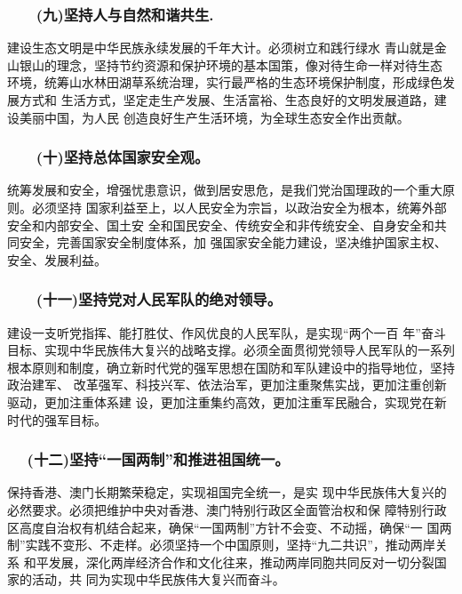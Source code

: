 \documentclass[11pt]{ctexart}
\begin{document}
{{{{\subsubsection{　　(九)坚持人与自然和谐共生.}
\label{sec:orgb7adac0}

建设生态文明是中华民族永续发展的千年大计。必须树立和践行绿水
青山就是金山银山的理念，坚持节约资源和保护环境的基本国策，像对待生命一样对待生态
环境，统筹山水林田湖草系统治理，实行最严格的生态环境保护制度，形成绿色发展方式和
生活方式，坚定走生产发展、生活富裕、生态良好的文明发展道路，建设美丽中国，为人民
创造良好生产生活环境，为全球生态安全作出贡献。

\subsubsection{　　(十)坚持总体国家安全观。}
\label{sec:org3662e3b}

统筹发展和安全，增强忧患意识，做到居安思危，是我们党治国理政的一个重大原则。必须坚持
国家利益至上，以人民安全为宗旨，以政治安全为根本，统筹外部安全和内部安全、国土安
全和国民安全、传统安全和非传统安全、自身安全和共同安全，完善国家安全制度体系，加
强国家安全能力建设，坚决维护国家主权、安全、发展利益。

\subsubsection{　　(十一)坚持党对人民军队的绝对领导。}
\label{sec:orge35ed86}

建设一支听党指挥、能打胜仗、作风优良的人民军队，是实现“两个一百
年”奋斗目标、实现中华民族伟大复兴的战略支撑。必须全面贯彻党领导人民军队的一系列
根本原则和制度，确立新时代党的强军思想在国防和军队建设中的指导地位，坚持政治建军、
改革强军、科技兴军、依法治军，更加注重聚焦实战，更加注重创新驱动，更加注重体系建
设，更加注重集约高效，更加注重军民融合，实现党在新时代的强军目标。

\subsubsection{　 (十二)坚持“一国两制”和推进祖国统一。}
\label{sec:org441e716}

保持香港、澳门长期繁荣稳定，实现祖国完全统一，是实
现中华民族伟大复兴的必然要求。必须把维护中央对香港、澳门特别行政区全面管治权和保
障特别行政区高度自治权有机结合起来，确保“一国两制”方针不会变、不动摇，确保“一
国两制”实践不变形、不走样。必须坚持一个中国原则，坚持“九二共识”，推动两岸关系
和平发展，深化两岸经济合作和文化往来，推动两岸同胞共同反对一切分裂国家的活动，共
同为实现中华民族伟大复兴而奋斗。

}}}}
\end{document}
